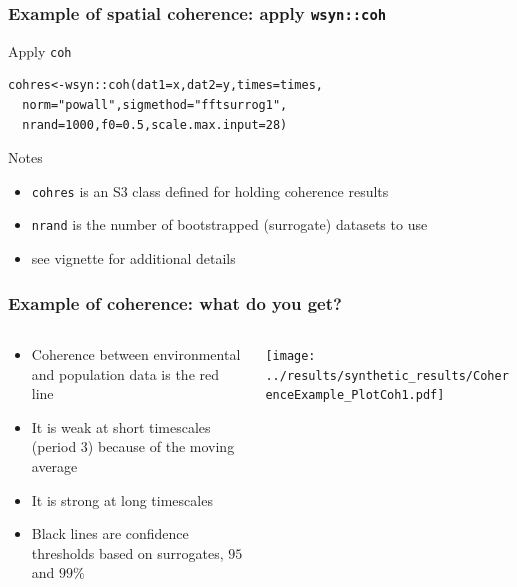 \documentclass{beamer}
\begin{document}
\begin{frame}[fragile]
\frametitle{Example of spatial coherence: apply \texttt{wsyn::coh}}
\begin{exampleblock}{Apply \texttt{coh}}
\begin{verbatim}
cohres<-wsyn::coh(dat1=x,dat2=y,times=times,
  norm="powall",sigmethod="fftsurrog1",
  nrand=1000,f0=0.5,scale.max.input=28)
\end{verbatim}
\end{exampleblock}
\begin{block}{Notes}
\begin{itemize}
\item \texttt{cohres} is an S3 class defined for holding coherence results
\item \texttt{nrand} is the number of bootstrapped (surrogate) datasets to use
\item see vignette for additional details
\end{itemize}
\end{block}
\end{frame}

\begin{frame}[fragile]
\frametitle{Example of coherence: what do you get?}
\begin{columns}[c]
\begin{column}{6cm}
\begin{itemize}
\item Coherence between environmental and population data is the red line
\item It is weak at short timescales (period 3) because of the moving average
\item It is strong at long timescales
\item Black lines are confidence thresholds based on surrogates, $95$ and $99\%$
\end{itemize}
\end{column}
\begin{column}{6cm}
\texttt{[image: ../results/synthetic\_results/CoherenceExample\_PlotCoh1.pdf]}
\end{column}
\end{columns}
\end{frame}
\end{document}
